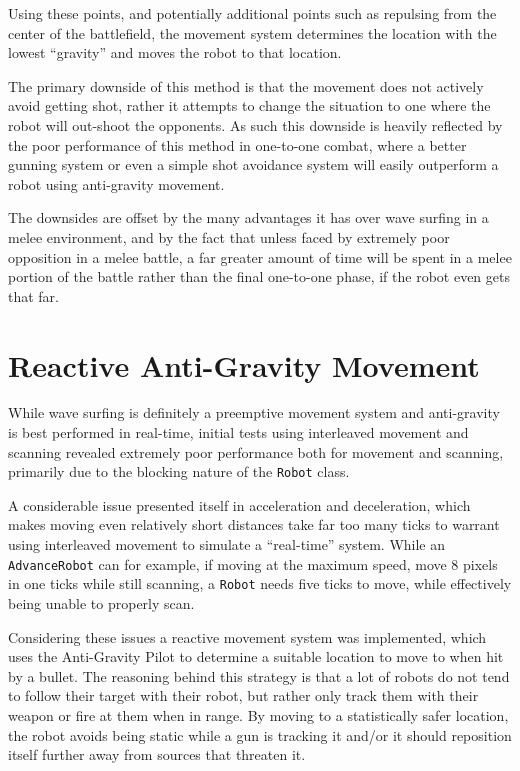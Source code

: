 \documentclass[11pt]{report}
\begin{document}
Using these points, and potentially additional points such as repulsing from the center of the battlefield, the movement system determines the location with the lowest ``gravity'' and moves the robot to that location.

The primary downside of this method is that the movement does not actively avoid getting shot, rather it attempts to change the situation to one where the robot will out-shoot the opponents. As such this downside is heavily reflected by the poor performance of this method in one-to-one combat, where a better gunning system or even a simple shot avoidance system will easily outperform a robot using anti-gravity movement.

The downsides are offset by the many advantages it has over wave surfing in a melee environment, and by the fact that unless faced by extremely poor opposition in a melee battle, a far greater amount of time will be spent in a melee portion of the battle rather than the final one-to-one phase, if the robot even gets that far.

\section{Reactive Anti-Gravity Movement} %
While wave surfing is definitely a preemptive movement system and anti-gravity is best performed in real-time, initial tests using interleaved movement and scanning revealed extremely poor performance both for movement and scanning, primarily due to the blocking nature of the \texttt{Robot} class.

A considerable issue presented itself in acceleration and deceleration, which makes moving even relatively short distances take far too many ticks to warrant using interleaved movement to simulate a ``real-time'' system. While an \texttt{AdvanceRobot} can for example, if moving at the maximum speed, move 8 pixels in one ticks while still scanning, a \texttt{Robot} needs five ticks to move, while effectively being unable to properly scan.

Considering these issues a reactive movement system was implemented, which uses the Anti-Gravity Pilot to determine a suitable location to move to when hit by a bullet. The reasoning behind this strategy is that a lot of robots do not tend to follow their target with their robot, but rather only track them with their weapon or fire at them when in range. By moving to a statistically safer location, the robot avoids being static while a gun is tracking it and/or it should reposition itself further away from sources that threaten it.
\end{document}

